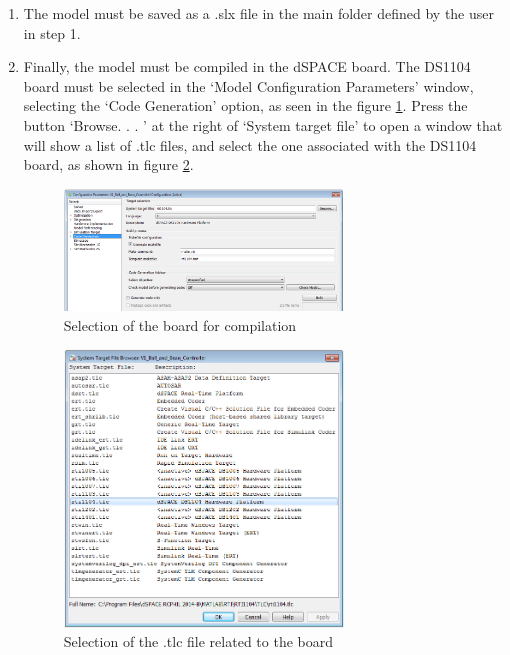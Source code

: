 \begin{enumerate}
    \item The model must be saved as a .slx file in the main folder defined by the user in step 1.

    \item Finally, the model must be compiled in the dSPACE board. The DS1104 board must be selected in the ‘Model Configuration Parameters’ window, selecting the ‘Code Generation’ option, as seen in the figure \ref{fig8}. Press the button ‘Browse. . . ’ at the right of ‘System target file’ to open a window that will show a list of .tlc files, and select the one associated with the DS1104 board, as shown in figure \ref{fig9}.
    \begin{figure}[H]
        \centering
        \includegraphics[width=0.7\textwidth]{Images/Ball and Bean/MatLab7.png}
        \caption{Selection of the board for compilation}
        \label{fig8}
    \end{figure}
    
    \begin{figure}[H]
        \centering
        \includegraphics[width=0.7\textwidth]{Images/Ball and Bean/MatLab8.png}
        \caption{ Selection of the .tlc file related to the board}
        \label{fig9}
    \end{figure}


\end{enumerate}
